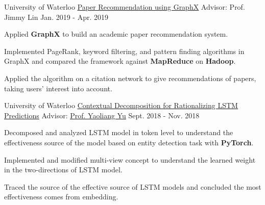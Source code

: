 

\begin{cventries}


  \cventry
    {University of Waterloo}
    {{\href{https://github.com/amyxie361/CS651_Paper_recommendation}{\underline{Paper Recommendation using GraphX}}}} %
    {Advisor: Prof. Jimmy Lin} %
    {Jan. 2019 - Apr. 2019} %
    {
      \begin{cvitems} %
        \item {Applied \textbf{GraphX} to build an academic paper recommendation system.}
        \item {Implemented PageRank, keyword filtering, and pattern finding algorithms in GraphX and compared the framework against \textbf{MapReduce} on \textbf{Hadoop}.}
        \item {Applied the algorithm on a citation network to give recommendations of papers, taking users’ interest into account. }
      \end{cvitems}
    }
    
    \cventry
    {University of Waterloo}
    {{\href{https://github.com/amyxie361/CS886}{\underline{Contextual Decomposition for Rationalizing LSTM Predictions}}}} %
    {Advisor: {\href{https://cs.uwaterloo.ca/~y328yu/}{\underline{Prof. Yaoliang Yu}}}} %
    {Sept. 2018 - Nov. 2018} %
    {
      \begin{cvitems} %
        \item {Decomposed and analyzed LSTM model in token level to understand the effectiveness source of the model based on entity detection task with \textbf{PyTorch}.}
        \item {Implemented and modified multi-view concept to understand the learned weight in the two-directions of LSTM model.}
        \item {Traced the source of the effective source of LSTM models and concluded the most effectiveness comes from embedding.}
      \end{cvitems}
    }
    

\end{cventries}
